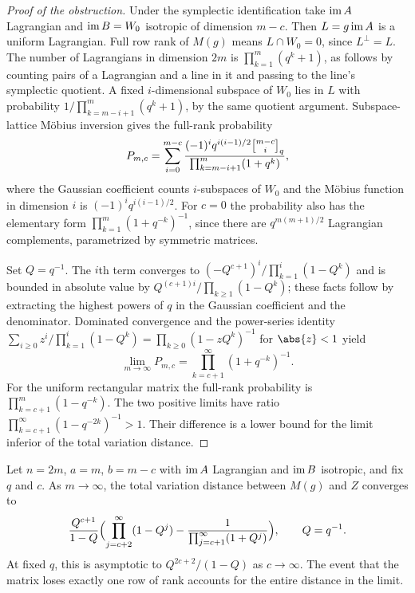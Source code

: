 \begin{proof}[Proof of the obstruction]
Under the symplectic identification take $\operatorname{im} A$ Lagrangian and
$\operatorname{im} B=W_0$ isotropic of dimension $m-c$. Then $L=g\operatorname{im} A$ is a uniform
Lagrangian. Full row rank of $M(g)$ means $L\cap W_0=0$, since $L^\perp=L$.
The number of Lagrangians in dimension $2m$ is $\prod_{k=1}^m(q^k+1)$, as
follows by counting pairs of a Lagrangian and a line in it and passing to the
line's symplectic quotient. A fixed $i$-dimensional subspace of $W_0$ lies in
$L$ with probability $1/\prod_{k=m-i+1}^{m}(q^k+1)$, by the same quotient
argument. Subspace-lattice M\"obius inversion gives the full-rank probability
\begin{equation}\label{spn:eq:Pmc}
 P_{m,c}=\sum_{i=0}^{m-c}
 \frac{(-1)^iq^{i(i-1)/2}\spnqbin{m-c}{i}{q}}{\prod_{k=m-i+1}^{m}(1+q^k)},
\end{equation}
where the Gaussian coefficient counts $i$-subspaces of $W_0$ and the M\"obius
function in dimension $i$ is $(-1)^iq^{i(i-1)/2}$. For $c=0$ the probability
also has the elementary form $\prod_{k=1}^m(1+q^{-k})^{-1}$, since there are
$q^{m(m+1)/2}$ Lagrangian complements, parametrized by symmetric matrices.

Set $Q=q^{-1}$. The $i$th term converges to
$(-Q^{c+1})^i/\prod_{k=1}^i(1-Q^k)$ and is bounded in absolute value by
$Q^{(c+1)i}/\prod_{k\ge1}(1-Q^k)$; these facts follow by extracting the
highest powers of $q$ in the Gaussian coefficient and the denominator.
Dominated convergence and the power-series identity
$\sum_{i\ge0}z^i/\prod_{k=1}^i(1-Q^k)=\prod_{k\ge0}(1-zQ^k)^{-1}$ for
$\abs{z}<1$ yield
\[
 \lim_{m\to\infty}P_{m,c}=\prod_{k=c+1}^\infty(1+q^{-k})^{-1}.
\]
For the uniform rectangular matrix the full-rank probability is
$\prod_{k=c+1}^{m}(1-q^{-k})$. The two positive limits have ratio
$\prod_{k=c+1}^\infty(1-q^{-2k})^{-1}>1$. Their difference is a lower bound
for the limit inferior of the total variation distance.
\end{proof}

\begin{theorem}\label{spn:thm:symplectic-exact}
Let $n=2m$, $a=m$, $b=m-c$ with $\operatorname{im} A$ Lagrangian and $\operatorname{im} B$
isotropic, and fix $q$ and $c$. As $m\to\infty$, the total variation distance
between $M(g)$ and $Z$ converges to
\begin{equation}\label{spn:eq:symplectic-limit}
 \frac{Q^{c+1}}{1-Q}\Bigl(\prod_{j=c+2}^{\infty}(1-Q^j)
 -\frac{1}{\prod_{j=c+1}^{\infty}(1+Q^j)}\Bigr),\qquad Q=q^{-1}.
\end{equation}
At fixed $q$, this is asymptotic to $Q^{2c+2}/(1-Q)$ as $c\to\infty$. The
event that the matrix loses exactly one row of rank accounts for the entire
distance in the limit.
\end{theorem}


